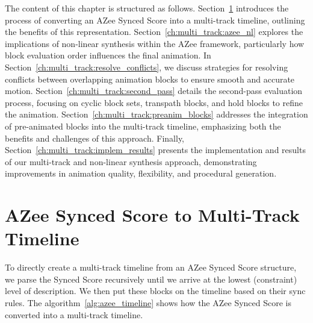 \documentclass[../../main.tex]{subfiles}
\begin{document}
The content of this chapter is structured as follows. Section~\ref{ch:multi_track:score_to_timeline} introduces the process of converting an AZee Synced Score into a multi-track timeline, outlining the benefits of this representation. Section~\ref{ch:multi_track:azee_nl} explores the implications of non-linear synthesis within the AZee framework, particularly how block evaluation order influences the final animation. In Section~\ref{ch:multi_track:resolve_conflicts}, we discuss strategies for resolving conflicts between overlapping animation blocks to ensure smooth and accurate motion. Section~\ref{ch:multi_track:second_pass} details the second-pass evaluation process, focusing on cyclic block sets, transpath blocks, and hold blocks to refine the animation. Section~\ref{ch:multi_track:preanim_blocks} addresses the integration of pre-animated blocks into the multi-track timeline, emphasizing both the benefits and challenges of this approach. Finally, Section~\ref{ch:multi_track:implem_results} presents the implementation and results of our multi-track and non-linear synthesis approach, demonstrating improvements in animation quality, flexibility, and procedural generation.

\section{AZee Synced Score to Multi-Track Timeline}
\label{ch:multi_track:score_to_timeline}

To directly create a multi-track timeline from an AZee Synced Score structure, we parse the Synced Score recursively until we arrive at the lowest (constraint) level of description. We then put these blocks on the timeline based on their sync rules. The algorithm~\ref{alg:azee_timeline} shows how the AZee Synced Score is converted into a multi-track timeline.
\end{document}
